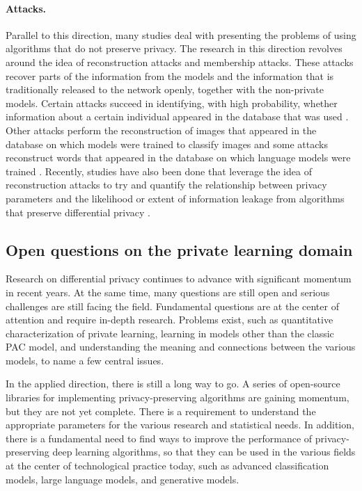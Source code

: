 \documentclass[12pt,a4paper,oneside,onecolumn]{book}
\begin{document}
\paragraph{Attacks.}
Parallel to this direction, many studies deal with presenting the problems of using algorithms that do not preserve privacy. 
The research in this direction revolves around the idea of reconstruction attacks and membership attacks. 
These attacks recover parts of the information from the models and the information that is traditionally released to the network openly, together with the non-private models. Certain attacks succeed in identifying, with high probability, whether information about a certain individual appeared in the database that was used \citep{shokri2017membership, hu2022membership, DBLP:journals/corr/abs-2112-03570, DBLP:journals/corr/abs-2007-14321}. 
Other attacks perform the reconstruction of images that appeared in the database on which models were trained to classify images \citep{DBLP:journals/corr/abs-2201-04845} and some attacks reconstruct words that appeared in the database on which language models were trained \citep{DBLP:journals/corr/abs-2012-07805}.
Recently, studies have also been done that leverage the idea of reconstruction attacks to try and quantify the relationship between privacy parameters and the likelihood or extent of information leakage from algorithms that preserve differential privacy \citep{hannun2021measuring, guo2022bounding}.

\subsection{Open questions on the private learning domain}

Research on differential privacy continues to advance with significant momentum in recent years. At the same time, many questions are still open and serious challenges are still facing the field. 
Fundamental questions are at the center of attention and require in-depth research. Problems exist, such as quantitative characterization of private learning, learning in models other than the classic PAC model, and understanding the meaning and connections between the various models, to name a few central issues.

In the applied direction, there is still a long way to go. A series of open-source libraries for implementing privacy-preserving algorithms are gaining momentum, but they are not yet complete. There is a requirement to understand the appropriate parameters for the various research and statistical needs. In addition, there is a fundamental need to find ways to improve the performance of privacy-preserving deep learning algorithms, so that they can be used in the various fields at the center of technological practice today, such as advanced classification models, large language models, and generative models.
\end{document}
